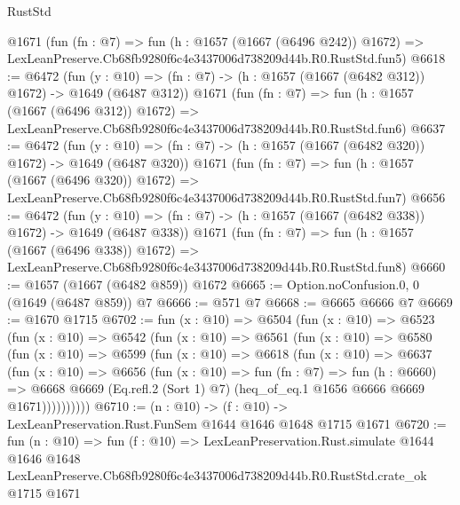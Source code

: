 \begin{lexlean}{RustStd}
\begin{coremodule}
    @1671
    (fun (fn : @7) =>
    fun (h : @1657 (@1667 (@6496 @242)) @1672) =>
    LexLeanPreserve.Cb68fb9280f6c4e3437006d738209d44b.R0.RustStd.fun5)
@6618 := @6472
    (fun (y : @10) => (fn : @7) -> (h : @1657 (@1667 (@6482 @312)) @1672) -> @1649 (@6487 @312))
    @1671
    (fun (fn : @7) =>
    fun (h : @1657 (@1667 (@6496 @312)) @1672) =>
    LexLeanPreserve.Cb68fb9280f6c4e3437006d738209d44b.R0.RustStd.fun6)
@6637 := @6472
    (fun (y : @10) => (fn : @7) -> (h : @1657 (@1667 (@6482 @320)) @1672) -> @1649 (@6487 @320))
    @1671
    (fun (fn : @7) =>
    fun (h : @1657 (@1667 (@6496 @320)) @1672) =>
    LexLeanPreserve.Cb68fb9280f6c4e3437006d738209d44b.R0.RustStd.fun7)
@6656 := @6472
    (fun (y : @10) => (fn : @7) -> (h : @1657 (@1667 (@6482 @338)) @1672) -> @1649 (@6487 @338))
    @1671
    (fun (fn : @7) =>
    fun (h : @1657 (@1667 (@6496 @338)) @1672) =>
    LexLeanPreserve.Cb68fb9280f6c4e3437006d738209d44b.R0.RustStd.fun8)
@6660 := @1657 (@1667 (@6482 @859)) @1672
@6665 := Option.noConfusion.{0, 0} (@1649 (@6487 @859)) @7
@6666 := @571 @7
@6668 := @6665 @6666 @7
@6669 := @1670 @1715
@6702 := fun (x : @10) =>
  @6504
    (fun (x : @10) =>
    @6523
      (fun (x : @10) =>
      @6542
        (fun (x : @10) =>
        @6561
          (fun (x : @10) =>
          @6580
            (fun (x : @10) =>
            @6599
              (fun (x : @10) =>
              @6618
                (fun (x : @10) =>
                @6637
                  (fun (x : @10) =>
                  @6656
                    (fun (x : @10) =>
                    fun (fn : @7) =>
                    fun (h : @6660) =>
                    @6668
                      @6669
                      (Eq.refl.{2} (Sort 1) @7)
                      (heq_of_eq.{1} @1656 @6666 @6669 @1671))))))))))
@6710 := (n : @10) -> (f : @10) -> LexLeanPreservation.Rust.FunSem @1644 @1646 @1648 @1715 @1671
@6720 := fun (n : @10) =>
  fun (f : @10) =>
  LexLeanPreservation.Rust.simulate
    @1644
    @1646
    @1648
    LexLeanPreserve.Cb68fb9280f6c4e3437006d738209d44b.R0.RustStd.crate_ok
    @1715
    @1671
\end{coremodule}
\end{lexlean}
